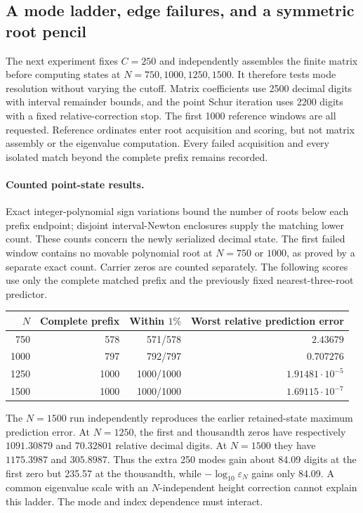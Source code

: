 \subsection{A mode ladder, edge failures, and a symmetric root pencil}
\label{ssec:mode-ladder-pencil}

The next experiment fixes $C=250$ and independently assembles the finite
matrix before computing states at $N=750,1000,1250,1500$. It therefore
tests mode resolution without varying the cutoff. Matrix coefficients
use 2500 decimal digits with interval remainder bounds, and the point
Schur iteration uses 2200 digits with a fixed relative-correction stop.
The first 1000 reference windows are all requested. Reference ordinates
enter root acquisition and scoring, but not matrix assembly or the
eigenvalue computation. Every failed acquisition and every isolated
match beyond the complete prefix remains recorded.

\paragraph{Counted point-state results.}
Exact integer-polynomial sign variations bound the number of roots
below each prefix endpoint; disjoint interval-Newton enclosures supply
the matching lower count. These counts concern the newly serialized
decimal state. The first failed window contains no movable polynomial
root at $N=750$ or $1000$, as proved by a separate exact count. Carrier
zeros are counted separately. The following scores use only the complete
matched prefix and the previously fixed nearest-three-root predictor.
\begin{center}\small
\begin{tabular}{r|rrr}
$N$&Complete prefix&Within $1\%$&Worst relative prediction error\\
\hline
750&578&571/578&$2.43679$\\
1000&797&792/797&$0.707276$\\
1250&1000&1000/1000&$1.91481\cdot10^{-5}$\\
1500&1000&1000/1000&$1.69115\cdot10^{-7}$
\end{tabular}
\end{center}
The $N=1500$ run independently reproduces the earlier retained-state
maximum prediction error. At $N=1250$, the first and thousandth zeros
have respectively $1091.30879$ and $70.32801$ relative decimal digits.
At $N=1500$ they have $1175.3987$ and $305.8987$. Thus the extra 250 modes
gain about 84.09 digits at the first zero but 235.57 at the thousandth,
while $-\log_{10}\varepsilon_N$ gains only 84.09. A common eigenvalue
scale with an $N$-independent height correction cannot explain this
ladder. The mode and index dependence must interact.

